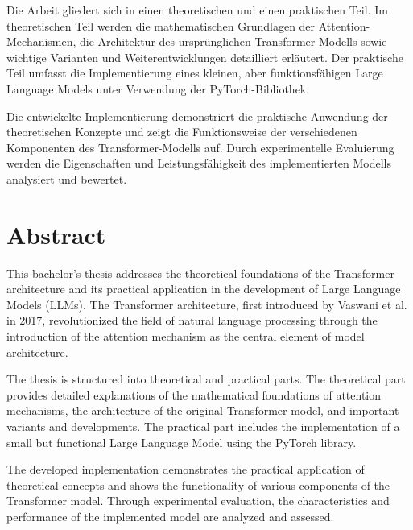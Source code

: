 \documentclass[12pt,a4paper,oneside]{report}
\begin{document}
Die Arbeit gliedert sich in einen theoretischen und einen praktischen Teil. Im theoretischen Teil werden die mathematischen Grundlagen der Attention-Mechanismen, die Architektur des ursprünglichen Transformer-Modells sowie wichtige Varianten und Weiterentwicklungen detailliert erläutert. Der praktische Teil umfasst die Implementierung eines kleinen, aber funktionsfähigen Large Language Models unter Verwendung der PyTorch-Bibliothek.

Die entwickelte Implementierung demonstriert die praktische Anwendung der theoretischen Konzepte und zeigt die Funktionsweise der verschiedenen Komponenten des Transformer-Modells auf. Durch experimentelle Evaluierung werden die Eigenschaften und Leistungsfähigkeit des implementierten Modells analysiert und bewertet.

\chapter*{Abstract}

This bachelor's thesis addresses the theoretical foundations of the Transformer architecture and its practical application in the development of Large Language Models (LLMs). The Transformer architecture, first introduced by Vaswani et al. in 2017, revolutionized the field of natural language processing through the introduction of the attention mechanism as the central element of model architecture.

The thesis is structured into theoretical and practical parts. The theoretical part provides detailed explanations of the mathematical foundations of attention mechanisms, the architecture of the original Transformer model, and important variants and developments. The practical part includes the implementation of a small but functional Large Language Model using the PyTorch library.

The developed implementation demonstrates the practical application of theoretical concepts and shows the functionality of various components of the Transformer model. Through experimental evaluation, the characteristics and performance of the implemented model are analyzed and assessed.


\tableofcontents
\listoffigures
\listoftables










\printbibliography

\appendix


\end{document}
